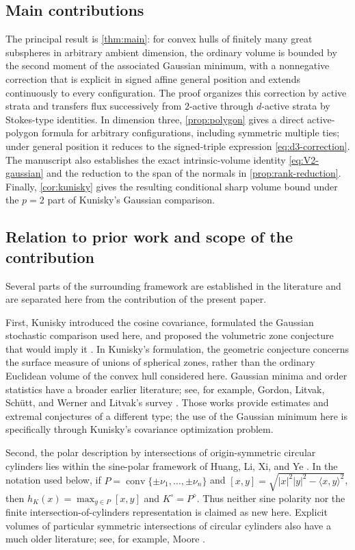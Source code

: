 \documentclass[10pt,reqno]{amsart}
\theoremstyle{definition}
\theoremstyle{remark}
\newcommand{\conv}{\operatorname{conv}}
\newcommand{\ip}[2]{\langle #1,#2\rangle}
\begin{document}
\subsection*{Main contributions}
The principal result is \cref{thm:main}: for convex hulls of finitely many great subspheres in arbitrary ambient dimension, the ordinary volume is bounded by the second moment of the associated Gaussian minimum, with a nonnegative correction that is explicit in signed affine general position and extends continuously to every configuration. The proof organizes this correction by active strata and transfers flux successively from $2$-active through $d$-active strata by Stokes-type identities. In dimension three, \cref{prop:polygon} gives a direct active-polygon formula for arbitrary configurations, including symmetric multiple ties; under general position it reduces to the signed-triple expression \eqref{eq:d3-correction}. The manuscript also establishes the exact intrinsic-volume identity \eqref{eq:V2-gaussian} and the reduction to the span of the normals in \cref{prop:rank-reduction}. Finally, \cref{cor:kunisky} gives the resulting conditional sharp volume bound under the $p=2$ part of Kunisky's Gaussian comparison.

\subsection*{Relation to prior work and scope of the contribution}
Several parts of the surrounding framework are established in the literature and are separated here from the contribution of the present paper.

First, Kunisky introduced the cosine covariance, formulated the Gaussian stochastic comparison used here, and proposed the volumetric zone conjecture that would imply it \cite{Kunisky}. In Kunisky's formulation, the geometric conjecture concerns the surface measure of unions of spherical zones, rather than the ordinary Euclidean volume of the convex hull considered here. Gaussian minima and order statistics have a broader earlier literature; see, for example, Gordon, Litvak, Sch\"utt, and Werner \cite{GordonMinima,GordonMinimum} and Litvak's survey \cite{LitvakSurvey}. Those works provide estimates and extremal conjectures of a different type; the use of the Gaussian minimum here is specifically through Kunisky's covariance optimization problem.

Second, the polar description by intersections of origin-symmetric circular cylinders lies within the sine-polar framework of Huang, Li, Xi, and Ye \cite{HuangLiXiYe}. In the notation used below, if $P=\conv\{\pm\nu_1,\dots,\pm\nu_n\}$ and $[x,y]=\sqrt{|x|^2|y|^2-\ip{x}{y}^2}$, then $h_K(x)=\max_{y\in P}[x,y]$ and $K^\circ=P^\diamond$. Thus neither sine polarity nor the finite intersection-of-cylinders representation is claimed as new here. Explicit volumes of particular symmetric intersections of circular cylinders also have a much older literature; see, for example, Moore \cite{MooreCylinders}.
\end{document}
